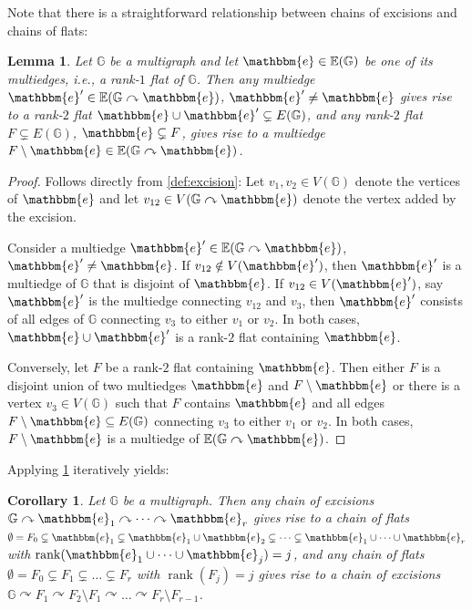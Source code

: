 \documentclass[11pt,reqno,a4paper]{amsart}
\theoremstyle{theoremstyle}
\newtheorem{lemma}[theorem]{Lemma}
\newtheorem{corollary}[theorem]{Corollary}
\theoremstyle{examplestyle}
\theoremstyle{algorithmstyle}
\newcommand{\EE}{\mathbb{E}}
\newcommand{\ee}{\mathbbm{e}}
\newcommand{\GG}{\mathbb{G}}
\DeclareMathOperator{\rank}{rank}
\begin{document}
Note that there is a straightforward relationship between chains of excisions and chains of flats:

\begin{lemma}
  \label{lem:excisionAndFlat}
  Let $\GG$ be a multigraph and let $\ee\in \EE(\GG)$ be one of its multiedges, i.e., a rank-$1$ flat of $\GG$.  Then any multiedge $\ee'\in\EE(\GG\curvearrowright \ee)$, $\ee'\neq\ee$ gives rise to a rank-$2$ flat $\ee\cup\ee'\subsetneq E(\GG)$, and any rank-$2$ flat $F\subsetneq E(\GG)$, $\ee\subsetneq F$, gives rise to a multiedge $F\setminus\ee\in\EE(\GG\curvearrowright\ee)$.
\end{lemma}
\begin{proof}
  Follows directly from \cref{def:excision}:  Let $v_1,v_2\in V(\GG)$ denote the vertices of $\ee$ and let $v_{12}\in V(\GG\curvearrowright\ee)$ denote the vertex added by the excision.

  Consider a multiedge $\ee'\in \EE(\GG\curvearrowright\ee)$, $\ee'\neq\ee$.  If $v_{12}\notin V(\ee')$, then $\ee'$ is a multiedge of $\GG$ that is disjoint of $\ee$. If $v_{12}\in V(\ee')$, say $\ee'$ is the multiedge connecting $v_{12}$ and $v_3$, then $\ee'$ consists of all edges of $\GG$ connecting $v_3$ to either $v_1$ or $v_2$.  In both cases, $\ee\cup\ee'$ is a rank-$2$ flat containing $\ee$.

  Conversely, let $F$ be a rank-$2$ flat containing $\ee$.  Then either $F$ is a disjoint union of two multiedges $\ee$ and $F\setminus \ee$ or there is a vertex $v_3\in V(\GG)$ such that $F$ contains $\ee$ and all edges $F\setminus \ee\subseteq E(\GG)$ connecting $v_3$ to either $v_1$ or $v_2$.  In both cases, $F\setminus \ee$ is a multiedge of $\EE(\GG\curvearrowright\ee)$.
\end{proof}

Applying \cref{lem:excisionAndFlat} iteratively yields:

\begin{corollary}
  \label{cor:excisionsAndChains}
  Let $\GG$ be a multigraph.  Then any chain of excisions $\GG\curvearrowright\ee_1\curvearrowright\dots\curvearrowright\ee_r$ gives rise to a chain of flats $\emptyset = F_0\subsetneq \ee_1 \subsetneq \ee_1\cup \ee_2 \subsetneq\dots\subsetneq \ee_1\cup\dots\cup\ee_r$ with $\rank(\ee_1\cup\dots\cup\ee_j)=j$, and any chain of flats $\emptyset=F_0\subsetneq F_1\subsetneq\dots\subsetneq F_r$ with $\rank(F_j)=j$ gives rise to a chain of excisions $\GG\curvearrowright F_1\curvearrowright F_2\setminus F_1\curvearrowright \dots\curvearrowright F_r\setminus F_{r-1}$.
\end{corollary}
\end{document}
